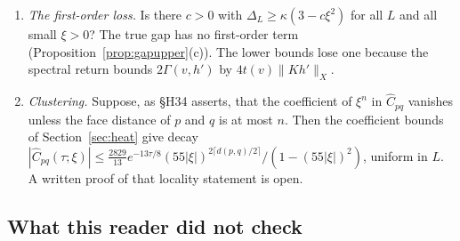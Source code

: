 \begin{enumerate}[label=\arabic*.]
\begin{itemize}
\item \emph{What it would give.} If confirmed, preferably in exact arithmetic, the inputs of orders 1--3 give $\Delta_L\ge\kappa d_3(\xi)$ for $g^2\ge3.7154$ (the threshold is $3.71533\ldots$), with $d_3(1/64)=1.902$.
\item \emph{Status.} The computation of the norms is reported by the referee and was not repeated here. The threshold and $d_3$ were recomputed here from its values, rounded up to $(m_3,t_3)=(1203.1425,127.2887)$.
\item \emph{Order 4.} An independent computation of order 4 (8{,}621 anchored multisets) would need a spin-network implementation.
\end{itemize}
\item \emph{The first-order loss.} Is there $c>0$ with $\Delta_L\ge\kappa(3-c\xi^2)$ for all $L$ and all small $\xi>0$? The true gap has no first-order term (Proposition~\ref{prop:gapupper}(c)). The lower bounds lose one because the spectral return bounds $2\Gamma(v,h')$ by $4t(v)\|Kh'\|_X$.
\item \emph{Clustering.} Suppose, as §H34 asserts, that the coefficient of $\xi^n$ in $\widehat C_{pq}$ vanishes unless the face distance of $p$ and $q$ is at most $n$. Then the coefficient bounds of Section~\ref{sec:heat} give decay $|\widehat C_{pq}(\tau;\xi)|\le\frac{2829}{13}e^{-13\tau/8}(55|\xi|)^{2\lceil d(p,q)/2\rceil}/(1-(55|\xi|)^2)$, uniform in $L$. A written proof of that locality statement is open.
\end{enumerate}

\subsection{What this reader did not check}

